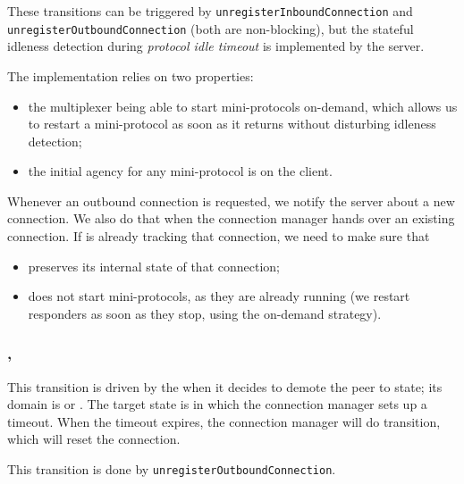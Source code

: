 \begin{detail}
  These transitions can be triggered by \texttt{unregisterInboundConnection} and
  \texttt{unregisterOutboundConnection} (both are non-blocking), but the
  stateful idleness detection during \textit{protocol idle timeout} is
  implemented by the server.

  The implementation relies on two properties:
  \begin{itemize}
    \item the multiplexer being able to start mini-protocols on-demand, which
      allows us to restart a mini-protocol as soon as it returns without
      disturbing idleness detection;
    \item the initial agency for any mini-protocol is on the client.
  \end{itemize}
\end{detail}

\begin{detail}
  Whenever an outbound connection is requested, we notify the server about
  a new connection.  We also do that when the connection manager hands over an
  existing connection.  If \inbgov{} is already tracking that connection,
  we need to make sure that
  \begin{itemize}
    \item \inbgov{} preserves its internal state of that connection;
    \item \inbgov{} does not start mini-protocols, as they are already running
      (we restart responders as soon as they stop, using the on-demand
      strategy).
  \end{itemize}
\end{detail}


\subsubsection{\DemotedToColdUniLoc{}, \DemotedToColdDupLoc{}}
This transition is driven by the \ptopgov{} when it decides to demote the peer
to \cold{} state; its domain is \OutboundStateAny{} or \OutboundStateDupTau{}.
The target state is \OutboundIdleStateAny{} in which the connection manager
sets up a timeout.  When the timeout expires, the connection manager will do
\CommitAnyLoc{} transition, which will reset the connection.

\begin{detail}
This transition is done by \texttt{unregisterOutboundConnection}.
\end{detail}


